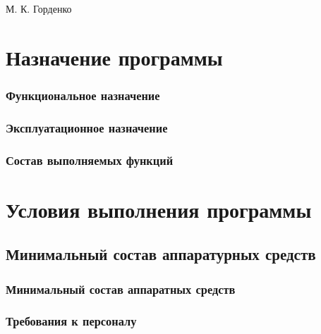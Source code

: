\documentclass[a4paper,12pt]{article}
\begin{document}
    {М. К. Горденко}

    \firstPage
    \newpage
    \secondPage
    \newpage
    \thirdPage
    \newpage


    \section{Назначение программы}

    \subsubsection{Функциональное назначение }

    \subsubsection{Эксплуатационное назначение}

    \subsubsection{Состав выполняемых функций}

    \newpage


    \section{Условия выполнения программы}
    \subsection{Минимальный состав аппаратурных средств
    }

    \subsubsection{Минимальный состав аппаратных средств}

    \subsubsection{Требования к персоналу}

    \newpage
\end{document}
